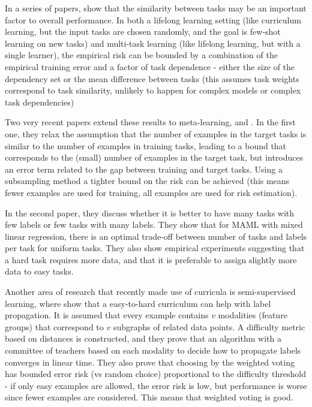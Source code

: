 \documentclass[letterpaper]{article}
\theoremstyle{definition}
\begin{document}
In a series of papers, \citet{Pentina2015} show that the similarity between tasks may be an important factor to overall performance. In both a lifelong learning setting (like curriculum learning, but the input tasks are chosen randomly, and the goal is few-shot learning on new tasks) and multi-task learning (like lifelong learning, but with a single learner), the empirical risk can be bounded by a combination of the empirical training error and a factor of task dependence - either the size of the dependency set or the mean difference between tasks (this assumes task weights correspond to task similarity, unlikely to happen for complex models or complex task dependencies)

Two very recent papers extend these results to meta-learning, \cite{Ding2021} and \cite{Cioba2021}.
In the first one, they relax the assumption that the number of examples in the target tasks is similar to the number of examples in training tasks, leading to a bound that corresponds to the (small) number of examples in the target task, but introduces an error term related to the gap between training and target tasks. Using a subsampling method a tighter bound on the risk can be achieved (this means fewer examples are used for training, all examples are used for risk estimation).

In the second paper, they discuss whether it is better to have many tasks with few labels or few tasks with many labels. They show that for MAML with mixed linear regression, there is an optimal trade-off between number of tasks and labels per task for uniform tasks. They also show empirical experiments suggesting that a hard task requires more data, and that it is preferable to assign slightly more data to easy tasks.

Another area of research that recently made use of curricula is semi-supervised learning, where \cite{Gong2019} show that a easy-to-hard curriculum can help with label propagation. 
It is assumed that every example contains $v$ modalities (feature groups) that correspond to $v$ subgraphs of related data points.
A difficulty metric based on distances is constructed, and they prove that an algorithm with a committee of teachers based on each modality to decide how to propagate labels converges in linear time.
They also prove that choosing by the weighted voting has bounded error risk (vs random choice) proportional to the difficulty threshold - if only easy examples are allowed, the error risk is low, but performance is worse since fewer examples are considered. This means that weighted voting is good.
\end{document}

